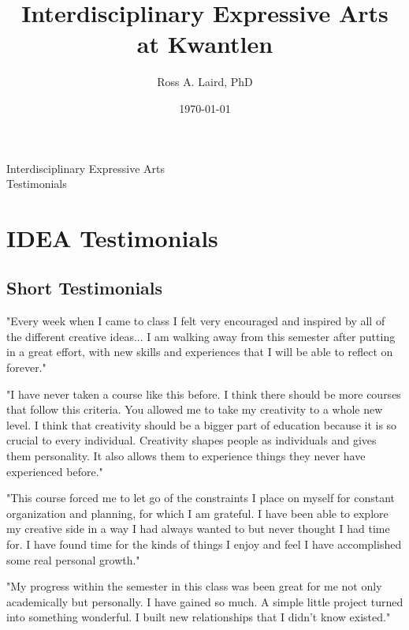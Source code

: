\documentclass[letterpaper,10pt,headsepline]{scrreprt}
\author{Ross A. Laird, PhD}
\title{Interdisciplinary Expressive Arts\\ at Kwantlen}
\date{\today}
\begin{document}
\pagestyle{empty}
\vspace*{7em} 
\begin{center}
\huge{Interdisciplinary Expressive Arts}\\
\vspace*{1em} 
\large{Testimonials}
\end{center}
\clearpage
\pagestyle{scrheadings}
\tableofcontents
\chapter{IDEA Testimonials}

\section{Short Testimonials}

"Every week when I came to class I felt very encouraged and inspired by all of the different creative ideas... I am walking away from this semester after putting in a great effort, with new skills and experiences that I will be able to reflect on forever."
\vspace{2em}

"I have never taken a course like this before. I think there should be more courses that follow this criteria. You allowed me to take my creativity to a whole new level. I think that creativity should be a bigger part of education because it is so crucial to every individual. Creativity shapes people as individuals and gives them personality. It also allows them to experience things they never have experienced before."
\vspace{2em}

"This course forced me to let go of the constraints I place on myself for constant organization and planning, for which I am grateful. I have been able to explore my creative side in a way I had always wanted to but never thought I had time for. I have found time for the kinds of things I enjoy and feel I have accomplished some real personal growth."
\vspace{2em}

"My progress within the semester in this class was been great for me not only academically but personally. I have gained so much. A simple little project turned into something wonderful. I built new relationships that I didn’t know existed."
\vspace{2em}
\end{document}
